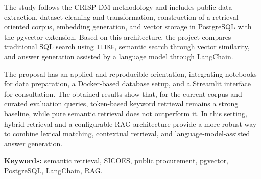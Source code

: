 The study follows the CRISP-DM methodology and includes public data extraction, dataset cleaning and transformation, construction of a retrieval-oriented corpus, embedding generation, and vector storage in PostgreSQL with the pgvector extension. Based on this architecture, the project compares traditional SQL search using \texttt{ILIKE}, semantic search through vector similarity, and answer generation assisted by a language model through LangChain.

The proposal has an applied and reproducible orientation, integrating notebooks for data preparation, a Docker-based database setup, and a Streamlit interface for consultation. The obtained results show that, for the current corpus and curated evaluation queries, token-based keyword retrieval remains a strong baseline, while pure semantic retrieval does not outperform it. In this setting, hybrid retrieval and a configurable RAG architecture provide a more robust way to combine lexical matching, contextual retrieval, and language-model-assisted answer generation.

\bigskip
\noindent \textbf{Keywords:} semantic retrieval, SICOES, public procurement, pgvector, PostgreSQL, LangChain, RAG.
